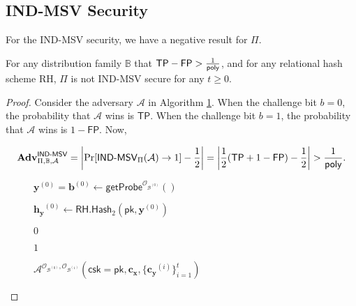 
\subsection{IND-MSV Security}
\label{sec:security_analysis:rh:IND-MSV}

For the IND-MSV security, we have a negative result for $\Pi$.

\begin{theorem}

For any distribution family $\mathbb{B}$ that $\textsf{TP} - \textsf{FP} > \frac{1}{\mathsf{poly}}$, and for any relational hash scheme \textsf{RH}, $\Pi$ is not IND-MSV secure for any $t \geq 0$.

\end{theorem}

\begin{proof}

Consider the adversary $\mathcal{A}$ in Algorithm \ref{alg:rh:ind}. When the challenge bit $b = 0$, the probability that $\mathcal{A}$ wins is $\textsf{TP}$. When the challenge bit $b = 1$, the probability that $\mathcal{A}$ wins is $1 - \textsf{FP}$. Now, 

\[
	\mathbf{Adv}_{\Pi, \mathbb{B}, \mathcal{A}}^{\textsf{IND-MSV}} = \left| \Pr[ \textsf{IND-MSV}_\Pi(\mathcal{A}) \to 1 ] - \frac{1}{2} \right| = \left| \frac{1}{2} (\textsf{TP} + 1 - \textsf{FP}) - \frac{1}{2} \right| > \frac{1}{\mathsf{poly}}.
\]

\begin{figure}[h]
\centering

	\begin{minipage}[t]{0.65\textwidth}
	\begin{algorithm}[H]
	\caption{$\mathcal{A}^{\mathcal{O}_{\mathcal{B}^{(0)}}, \mathcal{O}_{\mathcal{B}^{(1)}}} ( \textsf{csk} = \textsf{pk}, \mathbf{c_x}, \{ \mathbf{c_y}^{(i)} \}_{i=1}^t )$}
	\label{alg:rh:ind}
	\begin{algorithmic}[1]

		\State $\mathbf{y}^{(0)} = \mathbf{b}^{(0)} \gets \textsf{getProbe}^{\mathcal{O}_{\mathcal{B}^{(0)}}}()$
		
		\State $\mathbf{h_y}^{(0)} \gets \textsf{RH.Hash}_2(\textsf{pk}, \mathbf{y}^{(0)})$
		
		
			\State \Return $0$
		
		\Else
			
			\State \Return $1$
		
		\EndIf
	\end{algorithmic}
	\end{algorithm}
	\end{minipage}

\end{figure}

\end{proof}

